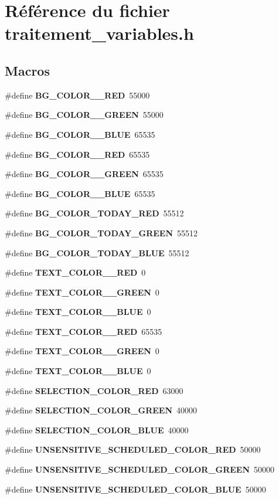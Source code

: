 \section{Référence du fichier traitement\_\-variables.h}
\label{traitement__variables_8h}
\subsection*{Macros}
\begin{DoxyCompactItemize}
\item 
\#define {\bf BG\_\-COLOR\_\_\-RED}~55000
\item 
\#define {\bf BG\_\-COLOR\_\_\-GREEN}~55000
\item 
\#define {\bf BG\_\-COLOR\_\_\-BLUE}~65535
\item 
\#define {\bf BG\_\-COLOR\_\_\-RED}~65535
\item 
\#define {\bf BG\_\-COLOR\_\_\-GREEN}~65535
\item 
\#define {\bf BG\_\-COLOR\_\_\-BLUE}~65535
\item 
\#define {\bf BG\_\-COLOR\_\-TODAY\_\-RED}~55512
\item 
\#define {\bf BG\_\-COLOR\_\-TODAY\_\-GREEN}~55512
\item 
\#define {\bf BG\_\-COLOR\_\-TODAY\_\-BLUE}~55512
\item 
\#define {\bf TEXT\_\-COLOR\_\_\-RED}~0
\item 
\#define {\bf TEXT\_\-COLOR\_\_\-GREEN}~0
\item 
\#define {\bf TEXT\_\-COLOR\_\_\-BLUE}~0
\item 
\#define {\bf TEXT\_\-COLOR\_\_\-RED}~65535
\item 
\#define {\bf TEXT\_\-COLOR\_\_\-GREEN}~0
\item 
\#define {\bf TEXT\_\-COLOR\_\_\-BLUE}~0
\item 
\#define {\bf SELECTION\_\-COLOR\_\-RED}~63000
\item 
\#define {\bf SELECTION\_\-COLOR\_\-GREEN}~40000
\item 
\#define {\bf SELECTION\_\-COLOR\_\-BLUE}~40000
\item 
\#define {\bf UNSENSITIVE\_\-SCHEDULED\_\-COLOR\_\-RED}~50000
\item 
\#define {\bf UNSENSITIVE\_\-SCHEDULED\_\-COLOR\_\-GREEN}~50000
\item 
\#define {\bf UNSENSITIVE\_\-SCHEDULED\_\-COLOR\_\-BLUE}~50000
\item 

\end{DoxyCompactItemize}
